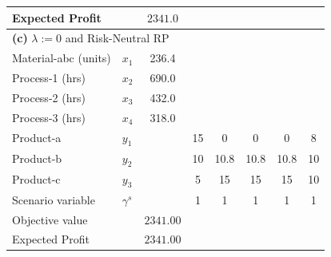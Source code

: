 \documentclass[7pt]{article}
\begin{document}
\begin{table}[h!]
\begin{tabular}{ll|c|ccccc}
        Expected Profit       &                                            & $2341.0$        &                                                                                     \\
        \midrule
        \multicolumn{8}{l}{\textbf{(c)} $\lambda:=0$ and Risk-Neutral RP}                                                                                                          \\
        \midrule
        Material-abc (units)  & $x_1$                                      & 236.4           &              &                   &               &                  &               \\
        Process-1 (hrs)       & $x_2$                                      & 690.0           &              &                   &               &                  &               \\
        Process-2 (hrs)       & $x_3$                                      & 432.0           &              &                   &               &                  &               \\
        Process-3 (hrs)       & $x_4$                                      & 318.0           &              &                   &               &                  &               \\
        Product-a             & $y_1$                                      &                 & 15           & 0                 & 0             & 0                & 8             \\
        Product-b             & $y_2$                                      &                 & 10           & 10.8              & 10.8          & 10.8             & 10            \\
        Product-c             & $y_3$                                      &                 & 5            & 15                & 15            & 15               & 10            \\
        Scenario variable     & $\gamma^s$                                 &                 & 1            & 1                 & 1             & 1                & 1             \\
        Objective value       &                                            & $2341.00$       &                                                                                     \\
        Expected Profit       &                                            & $2341.00$       &                                                                                     \\
        \bottomrule
    \end{tabular}
\end{table}
\end{document}
